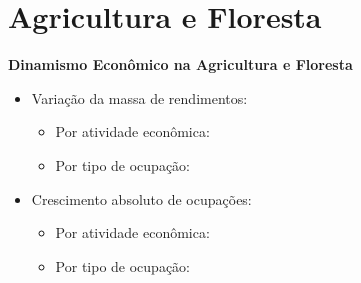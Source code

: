 \documentclass[8pt]{beamer}
\begin{document}
\begin{frame}
\textit{\hyperlink{indice_principal_amz_to}{}}

\end{frame}

\begin{frame}
\textit{\hyperlink{indice_principal_amz_to}{}}

\end{frame}


\section{Agricultura e Floresta}

\begin{frame}[label=indice_principal_amz_floresta]{}

\textit{\hyperlink{indice_principal}{}}

\textbf{Dinamismo Econômico na Agricultura e Floresta}
\vspace{2mm}

\begin{itemize}

\item{Variação da massa de rendimentos:
	\begin{itemize}
	\item{Por atividade econômica: \hyperlink{amzflorestarkngvmassaporcnae2dig}{}}
	\item{Por tipo de ocupação: \hyperlink{amzflorestarkngvmassaporcod2dig}{}}
	\end{itemize}
}
\vspace{1mm}

\item{Crescimento  absoluto de ocupações:
	\begin{itemize}
	\item{Por atividade econômica: \hyperlink{amzflorestarkngnocuporcnae2dig}{}}
	\item{Por tipo de ocupação: \hyperlink{amzflorestarkngnocuporcod2dig}{}}
	\end{itemize}
}
\vspace{1mm}

\end{itemize}

\end{frame}
\end{document}
